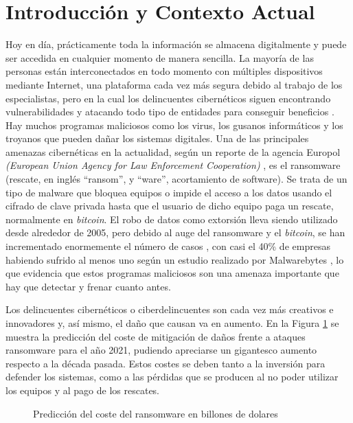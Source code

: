 \section{Introducción y Contexto Actual} \label{intro}

\noindent Hoy en día, prácticamente toda la información se almacena digitalmente y puede ser accedida en cualquier momento de manera sencilla. La mayoría de las personas están interconectados en todo momento con múltiples dispositivos mediante Internet, una plataforma cada vez más segura debido al trabajo de los especialistas, pero en la cual los delincuentes cibernéticos siguen encontrando vulnerabilidades y atacando todo tipo de entidades para conseguir beneficios \cite{STDWNCRY}. Hay muchos programas maliciosos como los virus, los gusanos informáticos y los troyanos que pueden dañar los sistemas digitales. Una de las principales amenazas cibernéticas en la actualidad, según un reporte de la agencia Europol \textit{(European Union Agency for Law Enforcement Cooperation)} \cite{3}, es el ransomware (rescate, en inglés ``ransom'', y ``ware'', acortamiento de software). Se trata de un tipo de malware que bloquea equipos o impide el acceso a los datos usando el cifrado de clave privada hasta que el usuario de dicho equipo paga un rescate, normalmente en \textit{bitcoin}. El robo de datos como extorsión lleva siendo utilizado desde alrededor de 2005, pero debido al auge del ransomware y el \textit{bitcoin}, se han incrementado enormemente el número de casos \cite{ZETTER}, con casi el 40\% de empresas habiendo sufrido al menos uno según un estudio realizado por Malwarebytes \cite{2}, lo que evidencia que estos programas maliciosos son una amenaza importante que hay que detectar y frenar cuanto antes.

Los delincuentes cibernéticos o ciberdelincuentes son cada vez más creativos e innovadores y, así mismo, el daño que causan va en aumento. En la Figura \ref{fig:im0-es} se muestra la predicción del coste de mitigación de daños frente a ataques ransomware para el año 2021, pudiendo apreciarse un gigantesco aumento respecto a la década pasada. Estos costes se deben tanto a la inversión para defender los sistemas, como a las pérdidas que se producen al no poder utilizar los equipos y al pago de los rescates.

\begin{figure}[h!]
\begin{center}
{}
\end{center}
\caption{Predicción del coste del ransomware en billones de dolares}
\label{fig:im0-es}
\end{figure}

